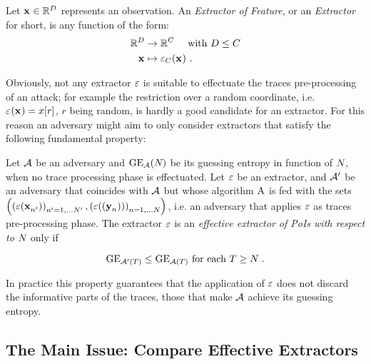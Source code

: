 \begin{definition}
Let $\sss[]{}\in \mathbb{R}^\traceLength$ represents an observation. An {\em Extractor of Feature}, or an {\em Extractor} for short, is any function of the form:
\begin{align*}
\mathbb{R}^\traceLength & \rightarrow \mathbb{R}^\newTraceLength \quad \mbox{ with } \traceLength \leq \newTraceLength \\
\sss[]{} & \mapsto \extractor[\newTraceLength]{\sss[]{}} \mbox{ .}
\end{align*}
\end{definition}
Obviously, not any extractor $\extract$ is suitable to effectuate the traces pre-processing of an attack; for example the restriction over a random coordinate, i.e. $\extractor{\sss[]{}} = x[r]$, $r$ being random, is hardly a good candidate for an extractor. For this reason an adversary might aim to only consider extractors that satisfy the following fundamental property:

\begin{property}
Let $\adversary$ be an adversary and $\guessingEntropy_\adversary(\numTraces[])$ be its guessing entropy in function of $\numTraces[]$, when no trace processing phase is effectuated. Let $\extract$ be an extractor, and $\adversary'$ be an adversary that coincides with $\adversary$ but whose algorithm $\attackAlgorithm$ is fed with the sets $ \left( \left(\extract(\sss[]{n'})\right)_{n'=1,\dots \numTraces[]'}, \left(\extract((\sssTest[]{n}))\right)_{n=1,\dots \numTraces[]} \right)$, i.e. an adversary that applies $\extract$ as traces pre-processing phase. The extractor $\extract$ is an {\em effective  extractor of PoIs with respect to $\numTraces[]$} only if 

\begin{equation}
\guessingEntropy_{\adversary'(T)} \leq \guessingEntropy_{\adversary(T)} \mbox{ for each } T \geq\numTraces[] \mbox{ .}
\end{equation}

\end{property}
In practice this property guarantees that the application of $\extract$ does not discard the informative parts of the traces, those that make $\adversary$ achieve its guessing entropy.

\subsection{The Main Issue:  Compare Effective Extractors}

